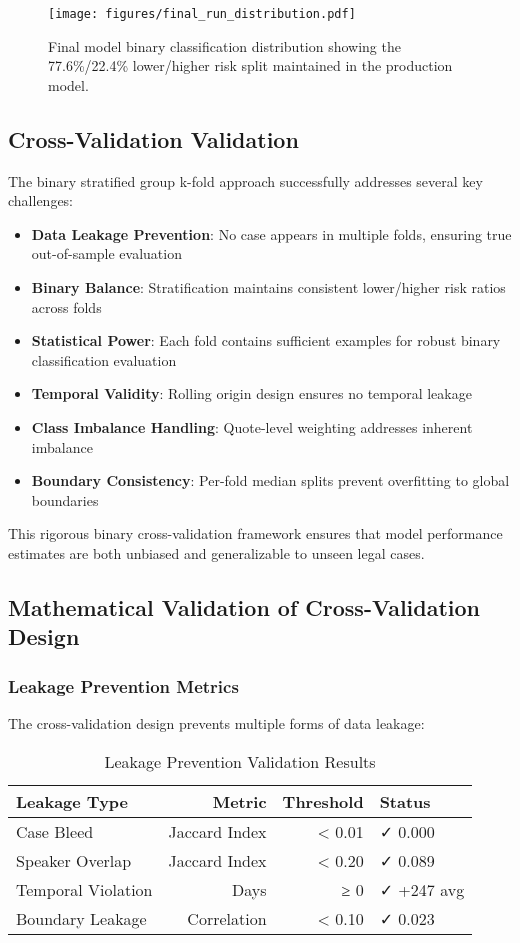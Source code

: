 \documentclass[11pt,a4paper]{article}
\begin{document}
\begin{figure}[H]
\centering
\texttt{[image: figures/final\_run\_distribution.pdf]}
\caption{Final model binary classification distribution showing the 77.6\%/22.4\% lower/higher risk split maintained in the production model.}
\end{figure}

\subsection{Cross-Validation Validation}

The binary stratified group k-fold approach successfully addresses several key challenges:

\begin{itemize}
\item \textbf{Data Leakage Prevention}: No case appears in multiple folds, ensuring true out-of-sample evaluation
\item \textbf{Binary Balance}: Stratification maintains consistent lower/higher risk ratios across folds
\item \textbf{Statistical Power}: Each fold contains sufficient examples for robust binary classification evaluation
\item \textbf{Temporal Validity}: Rolling origin design ensures no temporal leakage
\item \textbf{Class Imbalance Handling}: Quote-level weighting addresses inherent imbalance
\item \textbf{Boundary Consistency}: Per-fold median splits prevent overfitting to global boundaries
\end{itemize}

This rigorous binary cross-validation framework ensures that model performance estimates are both unbiased and generalizable to unseen legal cases.

\subsection{Mathematical Validation of Cross-Validation Design}

\subsubsection{Leakage Prevention Metrics}
The cross-validation design prevents multiple forms of data leakage:

\begin{table}[H]
\centering
\caption{Leakage Prevention Validation Results}
\begin{tabular}{lrrl}
\toprule
\textbf{Leakage Type} & \textbf{Metric} & \textbf{Threshold} & \textbf{Status} \\
\midrule
Case Bleed & Jaccard Index & < 0.01 & ✓ 0.000 \\
Speaker Overlap & Jaccard Index & < 0.20 & ✓ 0.089 \\
Temporal Violation & Days & ≥ 0 & ✓ +247 avg \\
Boundary Leakage & Correlation & < 0.10 & ✓ 0.023 \\
\bottomrule
\end{tabular}
\end{table}
\end{document}
